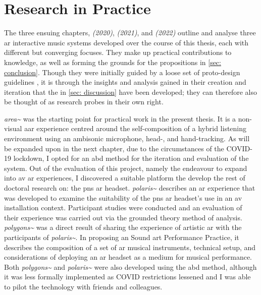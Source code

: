 \section{Research in Practice}
The three ensuing chapters, \textit{ (2020)}, \textit{ (2021)}, and \textit{ (2022)} outline and analyse three \gls{ar} interactive music systems developed over the course of this thesis, each with different but converging focuses. They make up practical contributions to knowledge, as well as forming the grounds for the propositions in \autoref{sec: conclusion}. Though they were initially guided by a loose set of proto-design guidelines \citep{bilbow2020}, it is through the insights and analysis gained in their creation and iteration that the  in \autoref{sec: discussion} have been developed; they can therefore also be thought of as research probes in their own right.

\textit{area\textasciitilde{}} was the starting point for practical work in the present thesis. It is a non-visual \gls{aar} experience centred around the self-composition of a hybrid listening environment using an ambisonic microphone, head-, and hand-tracking. As will be expanded upon in the next chapter, due to the circumstances of the COVID-19 lockdown, I opted for an \gls{abd} method for the iteration and evaluation of the system. Out of the evaluation of this project, namely the endeavour to expand into \gls{av} \gls{ar} experiences, I discovered a suitable platform the develop the rest of doctoral research on: the  \gls{pns} \gls{ar} headset. \textit{polaris\textasciitilde{}} describes an \gls{ar} experience that was developed to examine the suitability of the \gls{pns} \gls{ar} headset's use in an \gls{av} installation context. Participant studies were conducted and an evaluation of their experience was carried out via the grounded theory method of analysis. \textit{polygons\textasciitilde{}} was a direct result of sharing the experience of artistic \gls{ar} with the participants of \textit{polaris\textasciitilde{}}. In proposing an Sound \gls{art} Performance Practice, it describes the composition of a set of \gls{ar} musical instruments, technical setup, and considerations of deploying an \gls{ar} headset as a medium for musical performance. Both \textit{polygons\textasciitilde{}} and \textit{polaris\textasciitilde{}} were also developed using the \gls{abd} method, although it was less formally implemented as COVID restrictions lessened and I was able to pilot the technology with friends and colleagues.


